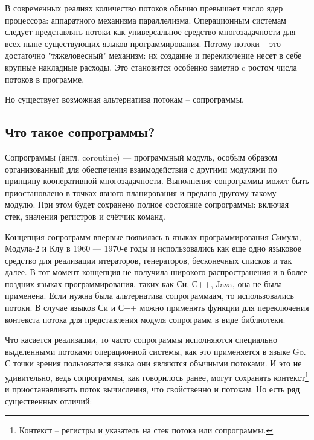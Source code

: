 	\par
	В современных реалиях количество потоков обычно превышает число ядер процессора: 
	аппаратного механизма параллелизма. Операционным системам следует представлять потоки
	как универсальное средство многозадачности для всех ныне существующих языков программирования. Потому потоки 
	-- это достаточно "тяжеловесный" механизм: их создание и переключение несет в себе крупные накладные расходы. 
	Это становится особенно заметно c ростом числа потоков в программе. 
	\par
	Но существует возможная альтернатива потокам -- сопрограммы.
	\clearpage
	
	\subsection{Что такое cопрограммы?}
	Сопрограммы (англ. coroutine) — программный модуль, особым образом организованный для обеспечения взаимодействия с другими модулями по принципу кооперативной многозадачности\cite{coroutine}. Выполнение сопрограммы может быть
	приостановлено в точках явного планирования и предано другому такому модулю. При этом будет сохранено полное
	состояние сопрограммы: включая стек, значения регистров и счётчик команд.
	\par
	Концепция сопрограмм впервые появилась в языках программирования Симула\cite{simula},
	Модула-2\cite{modula} и Клу\cite{clu} в 1960 — 1970-е годы и использовались как еще одно языковое средство для
	реализации итераторов, генераторов, бесконечных списков и так далее. В
	тот момент концепция не получила широкого распространения и в более поздних языках
	программирования, таких как Си, С++, Java, она не была применена. Если нужна была
	альтернатива сопрограммаам, то использовались потоки. В случае языков Си и С++ можно применять функции для
	переключения контекста потока для представления модуля сопрограмм в виде библиотеки.
	\par
	Что касается реализации, то часто сопрограммы исполняются специально выделенными потоками операционной системы,
	как это применяется в языке Go. С точки зрения пользователя языка они являются обычными потоками.
	И это не удивительно, ведь сопрограммы, как говорилось ранее, могут сохранять контекст\footnote{Контекст -- регистры и указатель на стек потока или сопрограммы.} и приостанавливать поток вычисления, что свойственно и потокам. Но есть ряд существенных отличий:
